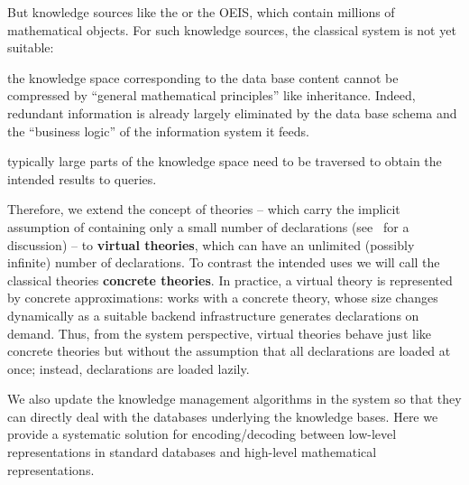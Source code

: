 But knowledge sources like the \lmfdb or the OEIS, which contain millions of mathematical objects. For such knowledge sources, the classical \mmt system is not yet suitable:
\begin{compactitem}
\item the knowledge space corresponding to the data base content cannot be compressed by ``general mathematical principles'' like inheritance. 
Indeed, redundant information is already largely eliminated by the data base schema and the ``business logic'' of the information system it feeds.
\item typically large parts of the knowledge space need to be traversed to obtain the intended results to queries.
\end{compactitem}
Therefore, we extend the concept of \ommt theories -- which carry the implicit assumption of containing only a small number of declarations (see~\cite{FaGu:lt92} for a discussion) -- to \textbf{virtual theories}, which can have an unlimited (possibly infinite) number of declarations. 
To contrast the intended uses we will call the classical \ommt theories \textbf{concrete theories}.  
In practice, a virtual theory is represented by concrete approximations: \ommt works with
a concrete theory, whose size changes dynamically as a suitable backend infrastructure
generates declarations on demand.
Thus, from the system perspective, virtual theories behave just like concrete theories but without the assumption that all declarations are loaded at once; instead, declarations  are loaded lazily.

We also update the knowledge management algorithms in the \mmt system so that they can directly deal with the databases underlying the knowledge bases.
Here we provide a systematic solution for encoding/decoding between low-level representations in standard databases and high-level mathematical representations.


